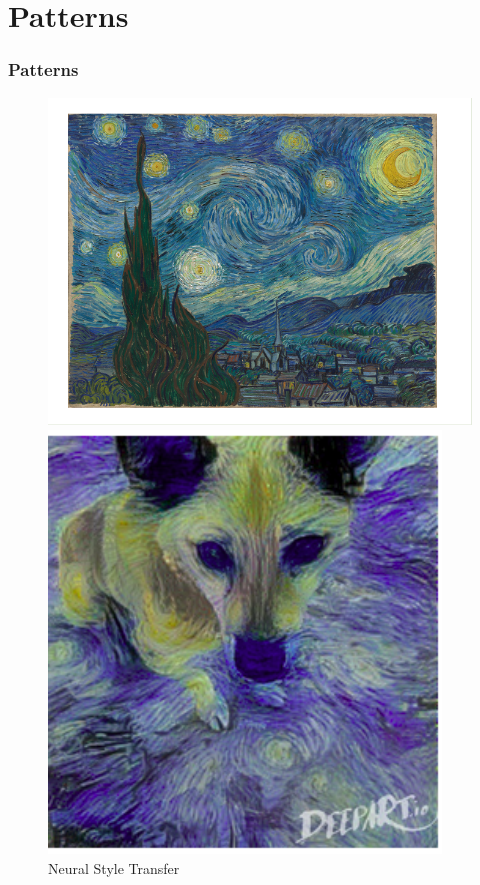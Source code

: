 \documentclass{beamer}
\begin{document}
\section{Patterns}
\begin{frame}
\frametitle{Patterns}
\begin{figure}[!ht]%
    \centering%
    \begin{minipage}{.48\textwidth}%
        \centering%
        \includegraphics[height=0.72\linewidth, trim = 1.15cm 1.15cm 1.90cm 1.15cm, clip]{img/starryNight_vanGogh.png}%
        \caption{~\parencite{starryNight}}%
        \label{fig:prob1_6_2}%
    \end{minipage}%
    \begin{minipage}{0.50\textwidth}%
        \centering%
        \includegraphics[height=0.75\linewidth]{img/cucio_starryNight_vanGogh.png}
        \caption{\tiny{Neural Style Transfer} ~\parencite{gatys2016image}}%
        \label{fig:prob1_6_1}%
    \end{minipage}%
\end{figure}
\end{frame}
\end{document}
